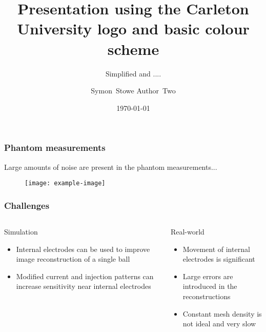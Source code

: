 \documentclass[10pt,    %
    english,            %
    xcolor=table,       %
    envcountsect,        %
    aspectratio=1610
]{beamer}
\title[] %
{Presentation using the Carleton University logo and basic colour scheme}
\subtitle{Simplified and ....}
\date[] %
    {\today}
\author[] %
{Symon~Stowe \alert{Author~Two}} %
\institute[] %
{\texttt{symonstowe@sce.carleton.ca}
}
\begin{document}
	
\begin{frame}
  \titlepage
\end{frame}


\begin{frame}
\frametitle{Phantom measurements}    
Large amounts of noise are present in the phantom measurements...
\begin{figure}[H]
\centering
\texttt{[image: example-image]}
\end{figure}
\end{frame}


\begin{frame}
\frametitle{Challenges}    
\begin{columns}[c]
\begin{column}{0.5\textwidth}
\alert{Simulation}
\begin{itemize}
\item Internal electrodes can be used to improve image reconstruction of a single ball
\item Modified current and injection patterns can increase sensitivity near internal electrodes
\end{itemize}
\end{column}
\begin{column}{0.5\textwidth}
\alert{Real-world}
\begin{itemize}
\item Movement of internal electrodes is significant 
\item Large errors are introduced in the reconstructions
\item Constant mesh density is not ideal and very slow
\end{itemize}
\end{column}
\end{columns}
\end{frame}


\begin{frame}
  \titlepage
\end{frame}

\end{document}
